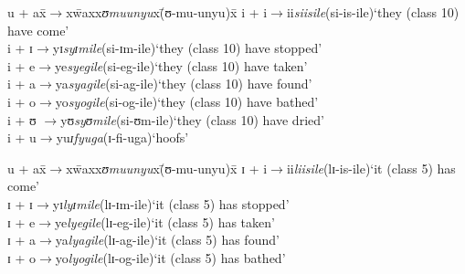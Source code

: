 \clearpage %
\begin{exe}
	\ex 
	\label{exVowelContacti}
	\begin{tabbing}
		u + ax\=$\rightarrow$x\=waxx\=\textit{ʊmuunyu}x\=(\degree ʊ-mu-unyu)x\=\kill%
		i + i\>$\rightarrow$\>ii\>\textit{siisile}\>(\degree si-is-ile)\>`they (class 10) have come'\\
		i + ɪ\>$\rightarrow$\>yɪ\>\textit{syɪmile}\>(\degree si-ɪm-ile)\>`they (class 10) have stopped'\\
		i + e\>$\rightarrow$\>ye\>\textit{syegile}\>(\degree si-eg-ile)\>`they (class 10) have taken'\\
		i + a\>$\rightarrow$\>ya\>\textit{syagile}\>(\degree si-ag-ile)\>`they (class 10) have found'\\
		i + o\>$\rightarrow$\>yo\>\textit{syogile}\>(\degree si-og-ile)\>`they (class 10) have bathed'\\
		i + ʊ \>$\rightarrow$\>yʊ\>\textit{syʊmile}\>(\degree si-ʊm-ile)\>`they (class 10) have dried'\\ 
		i + u\>$\rightarrow$\>yu\>\textit{ɪfyuga}\>(\degree ɪ-fi-uga)\>`hoofs'
	\end{tabbing}
	\ex
	\begin{tabbing}
		u + ax\=$\rightarrow$x\=waxx\=\textit{ʊmuunyu}x\=(\degree ʊ-mu-unyu)x\=\kill%
		ɪ + i\>$\rightarrow$\>ii\>\textit{liisile}\>(\degree lɪ-is-ile)\>`it (class 5) has come'\\
		ɪ + ɪ\>$\rightarrow$\>yɪ\>\textit{lyɪmile}\>(\degree lɪ-ɪm-ile)\>`it (class 5) has stopped'\\
		ɪ + e\>$\rightarrow$\>ye\>\textit{lyegile}\>(\degree lɪ-eg-ile)\>`it (class 5) has taken'\\
		ɪ + a\>$\rightarrow$\>ya\>\textit{lyagile}\>(\degree lɪ-ag-ile)\>`it (class 5) has found'\\
		ɪ + o\>$\rightarrow$\>yo\>\textit{lyogile}\>(\degree lɪ-og-ile)\>`it (class 5) has bathed'\\

\end{tabbing}
\end{exe}
